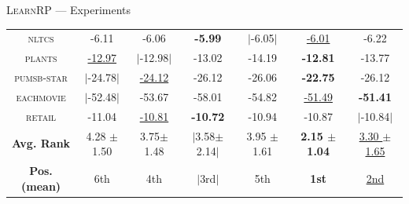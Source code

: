 \documentclass[aspectratio=169]{beamer}
\newenvironment{vhcenterb}{\vspace*{\fill}\begin{center}}{\end{center}\vspace*{\fill}}
\begin{document}
\begin{frame}[fragile]{\textsc{LearnRP} --- Experiments}
\begin{vhcenterb}
{{\begin{tabular}{c|ccccc|c}
    \textsc{nltcs} & -6.11 & -6.06 & \textbf{-5.99} & $|$-6.05$|$ & \underline{-6.01} & -6.22\\
    \textsc{plants} & \underline{-12.97} & $|$-12.98$|$ & -13.02 & -14.19 & \textbf{-12.81} & -13.77\\
    \textsc{pumsb-star} & $|$-24.78$|$ & \underline{-24.12} & -26.12 & -26.06 & \textbf{-22.75} & -26.12\\
    \textsc{eachmovie} & $|$-52.48$|$ & -53.67 & -58.01 & -54.82 & \underline{-51.49} & \textbf{-51.41}\\
    \textsc{retail} & -11.04 & \underline{-10.81} & \textbf{-10.72} & -10.94 & -10.87 & $|$-10.84$|$\\
    \hline
    \textbf{Avg. Rank} & 4.28 $\pm$ 1.50 & 3.75$ \pm$ 1.48 & $|$3.58$ \pm$ 2.14$|$ & 3.95 $\pm$ 1.61 & \textbf{2.15 $\pm$ 1.04} & \underline{3.30 $\pm$ 1.65}\\
    \hline
    \textbf{Pos. (mean)} & 6th & 4th & $|$3rd$|$ & 5th & \textbf{1st} & \underline{2nd} \\
    \hline
  \end{tabular}
  }
  }
\end{vhcenterb}
\end{frame}
\end{document}
